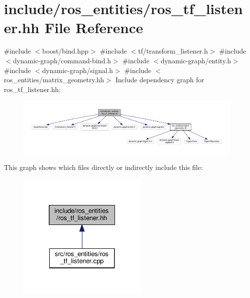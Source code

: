\hypertarget{ros__tf__listener_8hh}{}\section{include/ros\+\_\+entities/ros\+\_\+tf\+\_\+listener.hh File Reference}
\label{ros__tf__listener_8hh}
{\ttfamily \#include $<$boost/bind.\+hpp$>$}\newline
{\ttfamily \#include $<$tf/transform\+\_\+listener.\+h$>$}\newline
{\ttfamily \#include $<$dynamic-\/graph/command-\/bind.\+h$>$}\newline
{\ttfamily \#include $<$dynamic-\/graph/entity.\+h$>$}\newline
{\ttfamily \#include $<$dynamic-\/graph/signal.\+h$>$}\newline
{\ttfamily \#include $<$ros\+\_\+entities/matrix\+\_\+geometry.\+hh$>$}\newline
Include dependency graph for ros\+\_\+tf\+\_\+listener.\+hh\+:
\nopagebreak
\begin{figure}[H]
\begin{center}
\leavevmode
\includegraphics[width=350pt]{ros__tf__listener_8hh__incl}
\end{center}
\end{figure}
This graph shows which files directly or indirectly include this file\+:
\nopagebreak
\begin{figure}[H]
\begin{center}
\leavevmode
\includegraphics[width=181pt]{ros__tf__listener_8hh__dep__incl}
\end{center}
\end{figure}
